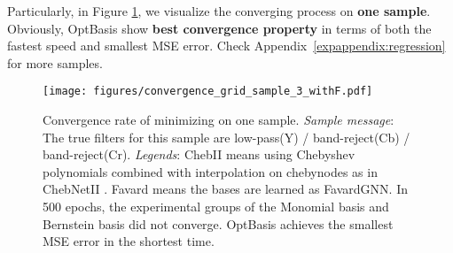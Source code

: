 \begin{table}[b]
\centering
\caption{
Experimental results of the multichannel filtering learning task. 
\textit{MSE loss}  \textit{standard errors}
of the 60 samples achieved by different bases are exhibited. 
}
\label{tbl:filter_all}
\end{table} 
Particularly, in Figure \ref{fig:regression}, we visualize 
the converging process on 
\textbf{one sample}. 
Obviously,  
OptBasis show \textbf{best convergence property} 
in terms of both the fastest speed and smallest MSE error. 
Check Appendix~\ref{expappendix:regression} for more samples.




\begin{figure}[h]
    \centering
    \tiny
    \texttt{[image: figures/convergence\_grid\_sample\_3\_withF.pdf]}
\caption{Convergence rate of minimizing  on one sample. 
    \textit{Sample message}: 
    The true filters for this sample are low-pass(Y) / band-reject(Cb) / band-reject(Cr). 
    \textit{Legends}: 
    ChebII means using Chebyshev polynomials combined with 
    interpolation on chebynodes as in ChebNetII \cite{he2022chebii}. Favard means the bases are learned as FavardGNN.  
    In 500 epochs, the experimental groups 
    of the Monomial basis and Bernstein basis did not converge. 
    OptBasis achieves 
    the smallest MSE error in the shortest time.
    }
    \label{fig:regression}
  \end{figure}




